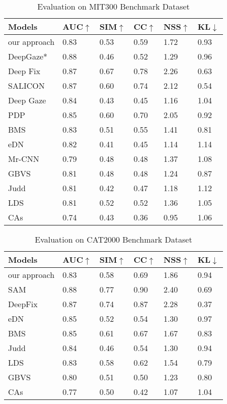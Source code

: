 \documentclass[letterpaper, 10 pt, conference]{ieeeconf}  %
\begin{document}
\begin{table}
\caption{Evaluation on MIT300 Benchmark Dataset}
\label{table}
\begin{tabular}{|p{50pt}|p{30pt}|p{30pt}|p{20pt}|p{30pt}|p{30pt}|}
\hline
Models & AUC$\uparrow$ & SIM$\uparrow$ & CC$\uparrow$ & NSS$\uparrow$ & KL$\downarrow$ \\
\hline
our approach & 0.83 & 0.53 & 0.59 & 1.72 & 0.93 \\
DeepGaze*\cite{b18} & 0.88 & 0.46 & 0.52 & 1.29 & 0.96 \\
Deep Fix\cite{b6} & 0.87 & 0.67 & 0.78 & 2.26 & 0.63 \\
SALICON\cite{b7} & 0.87 & 0.60 & 0.74 & 2.12 & 0.54 \\
Deep Gaze\cite{b18}  & 0.84 & 0.43 & 0.45 & 1.16 & 1.04 \\
PDP\cite{b21} & 0.85 & 0.60 & 0.70 & 2.05 & 0.92 \\
BMS\cite{b37} & 0.83 & 0.51 & 0.55 & 1.41 & 0.81 \\
eDN\cite{b15} & 0.82 & 0.41 & 0.45 & 1.14 & 1.14 \\
Mr-CNN\cite{b38} & 0.79 & 0.48 & 0.48 & 1.37 & 1.08 \\
GBVS\cite{b39} & 0.81 & 0.48 & 0.48 & 1.24 & 0.87 \\
Judd\cite{b23} & 0.81 & 0.42 & 0.47 & 1.18 & 1.12 \\
LDS\cite{b40} & 0.81 & 0.52 & 0.52 & 1.36 & 1.05 \\
CAs\cite{b41} & 0.74 & 0.43 & 0.36 & 0.95 & 1.06 \\
\hline
\end{tabular}
\label{tab2}
\end{table}

\begin{table}\centering
\caption{Evaluation on CAT2000 Benchmark Dataset}
\label{table}
\begin{tabular}{|p{50pt}|p{30pt}|p{30pt}|p{20pt}|p{30pt}|p{30pt}|}
\hline
Models & AUC$\uparrow$ & SIM$\uparrow$ & CC$\uparrow$ & NSS$\uparrow$ & KL$\downarrow$ \\
\hline
our approach & 0.83 & 0.58 & 0.69 & 1.86 & 0.94 \\
SAM\cite{b42} & 0.88 & 0.77 & 0.90 & 2.40 & 0.69 \\
DeepFix\cite{b6} & 0.87 & 0.74 & 0.87 & 2.28 & 0.37 \\
eDN\cite{b15} & 0.85 & 0.52 & 0.54 & 1.30 & 0.97 \\
BMS\cite{b37} & 0.85 & 0.61 & 0.67 & 1.67 & 0.83 \\
Judd\cite{b23} & 0.84 & 0.46 & 0.54 & 1.30 & 0.94 \\
LDS\cite{b40} & 0.83 & 0.58 & 0.62 & 1.54 & 0.79 \\
GBVS\cite{b39} & 0.80 & 0.51 & 0.50 & 1.23 & 0.80 \\
CAs\cite{b41} & 0.77 & 0.50 & 0.42 & 1.07 & 1.04 \\
\hline
\end{tabular}
\label{tab3}
\end{table}
\end{document}
